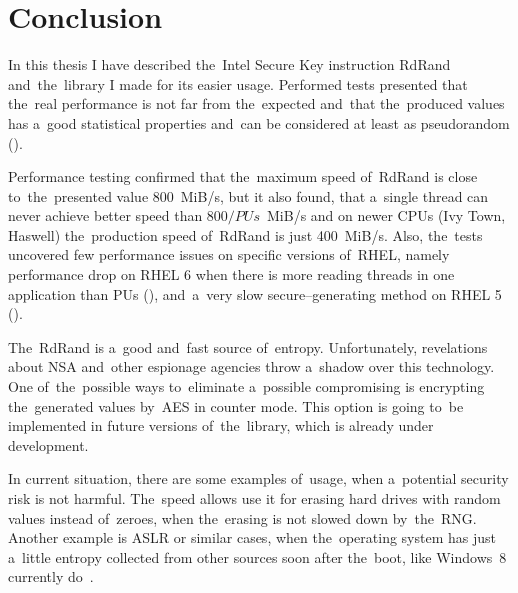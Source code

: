 \chapter{Conclusion}
\par{
In this thesis I have described the~Intel Secure Key instruction RdRand and~the~library I made for its easier usage. Performed tests presented that the~real performance is not far from the~expected and~that the~produced values has a~good statistical properties and~can be considered at least as pseudorandom ().
}

\par{
Performance testing confirmed that the~maximum speed of~RdRand is close to~the~presented value 800~MiB/s, but it also found, that a~single thread can never achieve better speed than
$800 / PUs$~MiB/s and on newer CPUs (Ivy Town, Haswell) the~production speed of~RdRand is just 400~MiB/s. Also, the~tests uncovered few performance issues on specific versions of~RHEL, namely performance drop on RHEL 6 when there is more reading threads in one application than PUs (), and~a~very slow secure--generating method on RHEL 5 ().
}

\par{
The~RdRand is a~good and~fast source of~entropy. Unfortunately, revelations about NSA and~other espionage agencies throw a~shadow over this technology. One of~the~possible ways to~eliminate a~possible compromising is encrypting the~generated values by~AES in counter mode. This option is going to~be implemented in future versions of~the~library, which is already under development.
}

\par{
In current situation, there are some examples of~usage, when a~potential security risk is not harmful. The~speed allows use it for erasing hard drives with random values instead of~zeroes, when the~erasing is not slowed down by~the~RNG. Another example is ASLR or similar cases, when the~operating system has just a~little entropy collected from other sources soon after the~boot, like Windows~8 currently do~\cite{WindowsASLR}.
}


